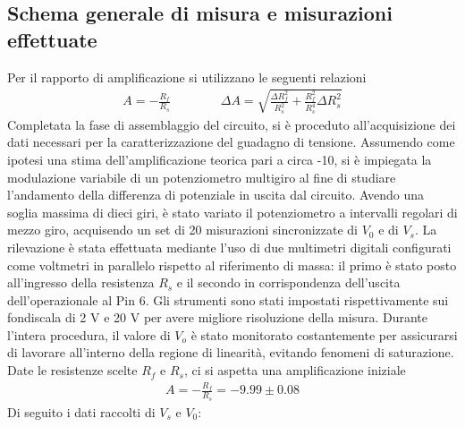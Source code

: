 \documentclass[a4paper, oneside]{article}
\begin{document}
\subsection{Schema generale di misura e misurazioni effettuate}
Per il rapporto di amplificazione si utilizzano le seguenti relazioni 
\begin{align}
    A = - \frac{R_f}{R_s}  \qquad \qquad \Delta A = \sqrt{\frac{\Delta R_f^{2}}{R_s^{2}} + \frac{R_f^{2}}{R_s^{4}}\Delta R_s^{2}} 
\end{align}
Completata la fase di assemblaggio del circuito, si è proceduto all'acquisizione dei dati necessari
per la caratterizzazione del guadagno di tensione. Assumendo come ipotesi una stima dell'amplificazione
teorica pari a circa -10, si è impiegata la modulazione variabile di un potenziometro multigiro al
fine di studiare l'andamento della differenza di potenziale in uscita dal circuito.
Avendo una soglia massima di dieci giri, è stato variato il potenziometro a intervalli
regolari di mezzo giro, acquisendo un set di 20 misurazioni sincronizzate di $V_0$ e di $V_s$.
La rilevazione è stata effettuata mediante l'uso di due multimetri digitali configurati come
voltmetri in parallelo rispetto al riferimento di massa:
il primo è stato posto all'ingresso della resistenza $R_s$ e il secondo in corrispondenza dell'uscita dell'operazionale al Pin 6. Gli strumenti sono stati impostati rispettivamente sui fondiscala di 2 V e 20 V per avere migliore risoluzione della misura. Durante l'intera procedura, il valore di $V_o$ è stato monitorato costantemente per assicurarsi di lavorare all'interno della regione di linearità, evitando fenomeni di saturazione. 
Date le resistenze scelte $R_f$ e $R_s$, ci si aspetta una amplificazione iniziale
\begin{align}
    A = - \frac{R_f}{R_s} = -9.99 \pm 0.08
\end{align}
Di seguito i dati raccolti di $V_s$ e $V_0$:
\end{document}
